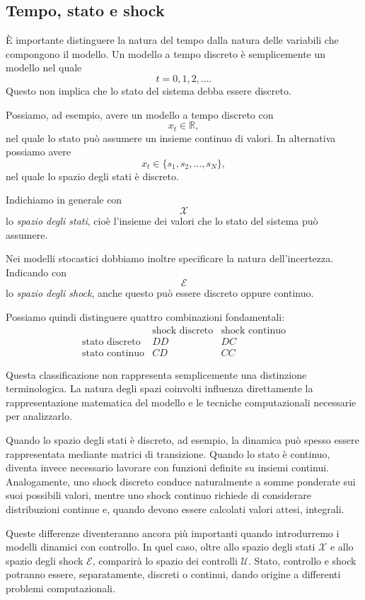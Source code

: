 \documentclass{book}
\begin{document}
\subsection{Tempo, stato e shock}

È importante distinguere la natura del tempo dalla natura delle variabili che compongono il modello. Un modello a tempo discreto è semplicemente un modello nel quale
\[
t=0,1,2,\ldots.
\]
Questo non implica che lo stato del sistema debba essere discreto.

Possiamo, ad esempio, avere un modello a tempo discreto con
\[
x_t\in\mathbb{R},
\]
nel quale lo stato può assumere un insieme continuo di valori. In alternativa possiamo avere
\[
x_t\in\{s_1,s_2,\ldots,s_N\},
\]
nel quale lo spazio degli stati è discreto.

Indichiamo in generale con
\[
\mathcal{X}
\]
lo \emph{spazio degli stati}, cioè l'insieme dei valori che lo stato del sistema può assumere.

Nei modelli stocastici dobbiamo inoltre specificare la natura dell'incertezza. Indicando con
\[
\mathcal{E}
\]
lo \emph{spazio degli shock}, anche questo può essere discreto oppure continuo.

Possiamo quindi distinguere quattro combinazioni fondamentali:
\[
\begin{array}{c|cc}
 & \text{shock discreto} & \text{shock continuo}\\
\hline
\text{stato discreto} & DD & DC\\
\text{stato continuo} & CD & CC
\end{array}
\]

Questa classificazione non rappresenta semplicemente una distinzione terminologica. La natura degli spazi coinvolti influenza direttamente la rappresentazione matematica del modello e le tecniche computazionali necessarie per analizzarlo.

Quando lo spazio degli stati è discreto, ad esempio, la dinamica può spesso essere rappresentata mediante matrici di transizione. Quando lo stato è continuo, diventa invece necessario lavorare con funzioni definite su insiemi continui. Analogamente, uno shock discreto conduce naturalmente a somme ponderate sui suoi possibili valori, mentre uno shock continuo richiede di considerare distribuzioni continue e, quando devono essere calcolati valori attesi, integrali.

Queste differenze diventeranno ancora più importanti quando introdurremo i modelli dinamici con controllo. In quel caso, oltre allo spazio degli stati $\mathcal{X}$ e allo spazio degli shock $\mathcal{E}$, comparirà lo spazio dei controlli $\mathcal{U}$. Stato, controllo e shock potranno essere, separatamente, discreti o continui, dando origine a differenti problemi computazionali.
\end{document}
